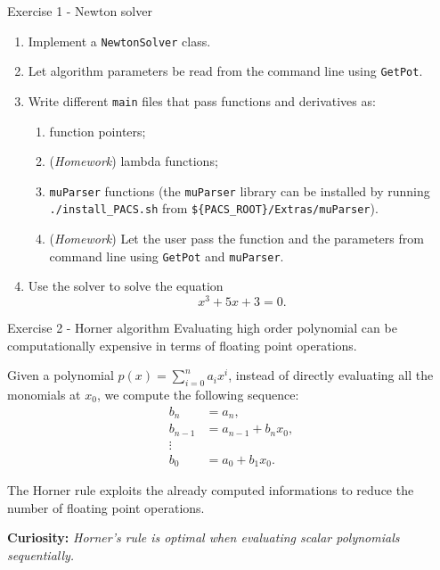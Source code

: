 \documentclass[10pt,aspectratio=169]{beamer}
\begin{document}
\begin{frame}{Exercise 1 - Newton solver}

\begin{enumerate}
    \item Implement a \texttt{NewtonSolver} class.
    \item Let algorithm parameters be read from the command line using \texttt{GetPot}.
    \item Write different \texttt{main} files that pass functions and derivatives as:
    \begin{enumerate}
        \item function pointers;
        \item (\textit{Homework}) lambda functions;
        \item \texttt{muParser} functions (the \texttt{muParser} library can be installed by running \texttt{./install\_PACS.sh} from \texttt{\$\{PACS\_ROOT\}/Extras/muParser}).
        \item (\textit{Homework}) Let the user pass the function and the parameters from command line using \texttt{GetPot} and \texttt{muParser}.
    \end{enumerate}
    \item Use the solver to solve the equation
    \begin{equation*}
        x^3 + 5 x + 3 = 0.
    \end{equation*}
\end{enumerate}
\end{frame}

\begin{frame}{Exercise 2 - Horner algorithm}
	Evaluating high order polynomial can be computationally expensive in terms of floating point operations. \\
	
	\medskip
	
Given a polynomial $\displaystyle p(x) = \sum_{i=0}^{n} a_i x^i$, instead of directly evaluating all the monomials at $x_0$, we compute the following sequence:
\begin{equation*} 
\begin{aligned}
	b_n &= a_n, \\
	b_{n-1} &= a_{n-1} + b_n x_0, \\
	\vdots \\
	b_{0} &= a_{0} + b_1 x_0.
\end{aligned}
\end{equation*}

	The Horner rule exploits the already computed informations to reduce the number of floating point operations.\\
	
	\medskip
	
	\textbf{Curiosity:} \textit{ Horner's rule is optimal when evaluating scalar polynomials sequentially.}
\end{frame}
\end{document}
